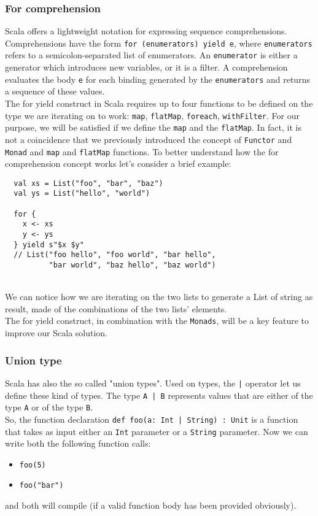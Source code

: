       

\subsubsection{For comprehension}
Scala offers a lightweight notation for expressing \gls{sequence comprehension}s.
Comprehensions have the form \texttt{for (enumerators) yield e}, where \texttt{enumerators} refers to a semicolon-separated list of enumerators.
An \texttt{enumerator} is either a generator which introduces new variables, or it is a filter.
A comprehension evaluates the body \texttt{e} for each binding generated by the \texttt{enumerators} and returns a sequence of these values.\\
The for yield construct in Scala requires up to four functions to be defined on the type we are iterating on to work: \texttt{map}, \texttt{flatMap}, \texttt{foreach}, \texttt{withFilter}.
For our purpose, we will be satisfied if we define the \texttt{map} and the \texttt{flatMap}.
In fact, it is not a coincidence that we previously introduced the concept of \texttt{Functor} and \texttt{Monad} and \texttt{map} and \texttt{flatMap} functions.
To better understand how the for comprehension concept works let's consider a brief example:
\begin{verbatim}
  val xs = List("foo", "bar", "baz")
  val ys = List("hello", "world")

  for {
    x <- xs
    y <- ys
  } yield s"$x $y"
  // List("foo hello", "foo world", "bar hello", 
          "bar world", "baz hello", "baz world")
\end{verbatim}\mbox{}\\
We can notice how we are iterating on the two lists to generate a List of string as result, made of the combinations of the two lists' elements.\\
The for yield construct, in combination with the \texttt{Monads}, will be a key feature to improve our Scala solution.

\subsubsection{Union type}
\label{sssec:union}
Scala has also the so called "union types".
Used on types, the \texttt{|} operator let us define these kind of types. The type \texttt{A | B} represents values that are either of the type \texttt{A} or of the type \texttt{B}.\\
So, the function declaration \texttt{def foo(a: Int | String)  : Unit} is a function that takes as input either an \texttt{Int} parameter or a \texttt{String} parameter.
Now we can write both the following function calls:
\begin{itemize}
  \item \texttt{foo(5)}
  \item \texttt{foo("bar")}
\end{itemize}
and both will compile (if a valid function body has been provided obviously).



